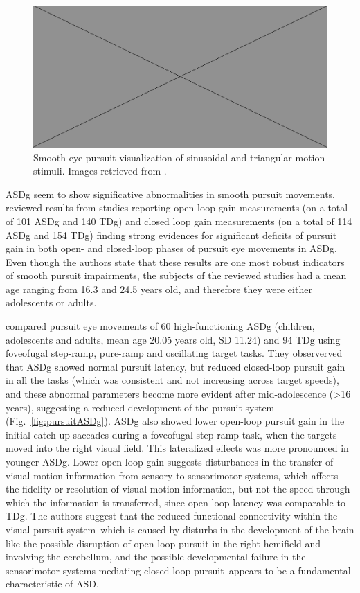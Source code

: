\begin{figure}[h]
  \centering
  \includegraphics[width=.5\textwidth]{figures/placeholderImg.jpg}
  \caption[sinusoidal and triangular motion]{Smooth eye pursuit visualization of sinusoidal and triangular motion stimuli. Images retrieved from \cite{vonhofsten1997smoothpursuit}.}
  \label{fig:sinetriangle}
\end{figure}

ASDg seem to show significative abnormalities in smooth pursuit movements. \cite{johnson2016review} reviewed results from studies reporting open loop gain measurements (on a total of 101 ASDg and 140 TDg) and closed loop gain measurements (on a total of 114 ASDg and 154 TDg) finding strong evidences for significant deficits of pursuit gain in both open- and closed-loop phases of pursuit eye movements in ASDg. Even though the authors state that these results are one most robust indicators of smooth pursuit impairments, the subjects of the reviewed studies had a mean age ranging from 16.3 and 24.5 years old, and therefore they were either adolescents or adults.

\cite{takarae2004smoothpursuit} compared pursuit eye movements of 60 high-functioning ASDg (children, adolescents and adults, mean age 20.05 years old, SD 11.24) and 94 TDg using foveofugal step-ramp, pure-ramp and oscillating target tasks. They observerved that ASDg showed normal pursuit latency, but reduced closed-loop pursuit gain in all the tasks (which was consistent and not increasing across target speeds), and these abnormal parameters become more evident after mid-adolescence (>16 years), suggesting a reduced development of the pursuit system  (Fig.~\ref{fig:pursuitASDg}). ASDg also showed lower open-loop pursuit gain in the initial catch-up saccades during a foveofugal step-ramp task, when the targets moved into the right visual field. This lateralized effects was more pronounced in younger ASDg. 
Lower open-loop gain suggests disturbances in the transfer of visual motion information from sensory to sensorimotor systems, which affects the fidelity or resolution of visual motion information, but not the speed through which the information is transferred, since open-loop latency was comparable to TDg.
The authors suggest that the reduced functional connectivity within the visual pursuit system–which is caused by disturbs in the development of the brain like the possible disruption of open-loop pursuit in the right hemifield and involving the cerebellum, and the possible developmental failure in the sensorimotor systems mediating closed-loop pursuit–appears to be a fundamental characteristic of ASD.

